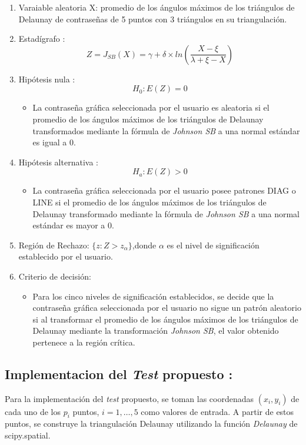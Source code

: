 \documentclass[12pt]{report}
\begin{document}
\begin{enumerate}
	\item Varaiable aleatoria X: promedio de los ángulos máximos de los triángulos de Delaunay de contraseñas de 5 puntos con 3 triángulos en su triangulación.
	\item Estadígrafo : \[
	Z= J_{SB}(X) =  \gamma + \delta \times ln\left(\frac{X - \xi}{\lambda + \xi - X}\right)
	\]

	\item Hipótesis nula : \[H_0:E(Z)=0\]
	\begin{itemize}
		\item La contraseña gráfica seleccionada por el usuario es aleatoria si el promedio de los ángulos máximos de los triángulos de Delaunay  transformados mediante la fórmula de \textit{Johnson SB} a una normal estándar es igual a 0.
	\end{itemize}
	
	
	\item Hipótesis alternativa : \[H_a:E(Z)>0\]
			\begin{itemize}
			\item La contraseña gráfica seleccionada por el usuario posee patrones DIAG o LINE  si el promedio de los ángulos máximos de los triángulos de Delaunay  transformado mediante la fórmula de \textit{Johnson SB} a una normal estándar es mayor a 0.
		\end{itemize}
	
	\item  Región de Rechazo: $\{z:Z>z_\alpha\}$,donde $\alpha$ es el nivel de significación establecido por el usuario. 
	
	\item Criterio de decisión:
	\begin{itemize}
		\item Para los cinco niveles de significación establecidos, se decide que la contraseña gráfica seleccionada por el usuario no sigue un patrón aleatorio si al transformar el promedio de los ángulos máximos de los triángulos de Delaunay mediante la transformación \textit{Johnson SB}, el valor obtenido pertenece a la región crítica. 
	\end{itemize}
	\end{enumerate}	 

\subsection{Implementacion del \textit{Test} propuesto :}
Para la implementación del \textit{test} propuesto, se toman las coordenadas \((x_i, y_i)\) de cada uno de los \(p_i\) puntos, \(i = 1, \ldots, 5\) como valores de entrada. A partir de estos puntos, se construye la triangulación Delaunay utilizando la función \textit{Delaunay} de scipy.spatial.
\end{document}
